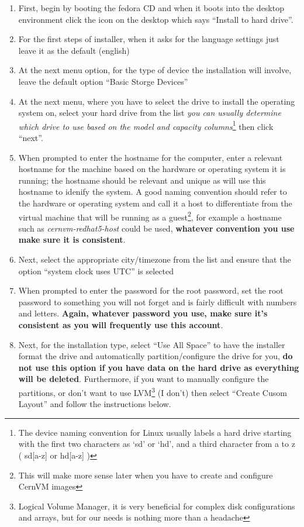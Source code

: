 \begin{enumerate}
\item First, begin by booting the fedora CD and when it boots into the desktop environment click the icon on the desktop which says
	  ``Install to hard drive''.
	  
\item	For the first steps of installer, when it asks for the language settings just leave it as the default (english)

\item 	At the next menu option, for the type of device the installation will involve, leave the default option ``Basic Storge Devices''

\item 	At the next menu, where you have to select the drive to install the operating system on, select your hard drive from the list
	  	\emph{you can usually determine which drive to use based on the model and capacity columns}\footnote{ The device naming convention
	  	for Linux usually labels a hard drive starting with the first two characters as `sd' or `hd', and a third character from a to z 
	  	( sd[a-z] or hd[a-z] )} then click ``next''.
	  
\item 	When prompted to enter the hostname for the computer, enter a relevant hostname for the machine based on the hardware or operating
		system it is running; the hostname should be relevant and unique as \tapper will use this hostname to idenify the system. A good naming
		convention should refer to the hardware or operating system and call it a host to differentiate from the virtual machine that will be
		running as a guest\footnote{This will make more sense later when you have to create and configure CernVM images}, for example a hostname such
		as \emph{cernvm-redhat5-host} could be used, {\bf whatever convention you use make sure it is consistent}.
		
\item	Next, select the appropriate city/timezone from the list and ensure that the option ``system clock uses UTC'' is selected

\item	When prompted to enter the password for the root password, set the root password to something you will not forget and is fairly
		difficult with numbers and letters. {\bf Again, whatever password you use,  make sure it's consistent as you will frequently
		use this account}.
		
\item	Next, for the installation type, select ``Use All Space'' to have the installer format the drive and automatically partition/configure
		the drive for you, {\bf do not use this option if you have data on the hard drive as everything will be deleted}. Furthermore, if you
		want to manually configure the partitions, or don't want to use LVM\footnote{Logical Volume Manager, it is very beneficial for complex
		disk configurations and arrays, but for our needs is nothing more than a headache} (I don't) then select ``Create Cusom Layout''
		and follow the instructions below.
		

\end{enumerate}
